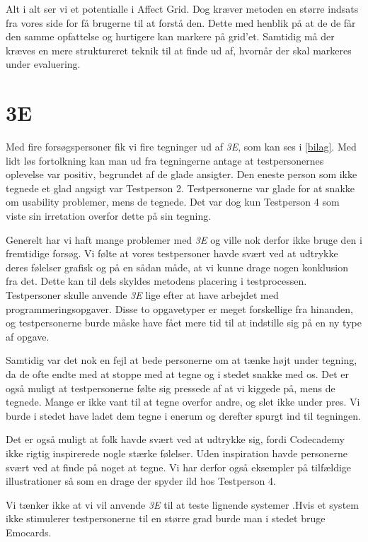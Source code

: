 Alt i alt ser vi et potentialle i Affect Grid. Dog kræver metoden en større indsats fra vores side for få brugerne til at forstå den. Dette med henblik på at de de får den samme opfattelse og hurtigere kan markere på grid'et. Samtidig må der kræves en mere struktureret teknik til at finde ud af, hvornår der skal markeres under evaluering.  


\section{3E}\label{sec:eval3E}
Med fire forsøgspersoner fik vi fire tegninger ud af \textit{3E}, som kan ses i \cref{bilag}. Med lidt løs fortolkning kan man ud fra tegningerne antage at testpersonernes oplevelse var positiv, begrundet af de glade ansigter. Den eneste person som ikke tegnede et glad angsigt var Testperson 2. Testpersonerne var glade for at snakke om usability problemer, mens de tegnede. Det var dog kun Testperson 4 som viste sin irretation overfor dette på sin tegning. 

Generelt har vi haft mange problemer med \textit{3E} og ville nok derfor ikke bruge den i fremtidige forsøg. Vi følte at vores testpersoner havde svært ved at udtrykke deres følelser grafisk og på en sådan måde, at vi kunne drage nogen konklusion fra det. Dette kan til dels skyldes metodens placering i testprocessen. Testpersoner skulle anvende \textit{3E} lige efter at have arbejdet med programmeringsopgaver. Disse to opgavetyper er meget forskellige fra hinanden, og testpersonerne burde måske have fået  mere tid til at indstille sig på en ny type af opgave.   

Samtidig var det nok en fejl at bede personerne om at tænke højt under tegning, da de ofte endte med at stoppe med at tegne og i stedet snakke med os. Det er også muligt at testpersonerne følte sig pressede af at vi kiggede på, mens de tegnede. Mange er ikke vant til at tegne overfor andre, og slet ikke under pres. Vi burde i stedet have ladet dem tegne i enerum og derefter spurgt ind til tegningen. 

Det er også muligt at folk havde svært ved at udtrykke sig, fordi Codecademy ikke rigtig inspirerede nogle stærke følelser. Uden inspiration havde personerne svært ved at finde på noget at tegne. Vi har derfor også eksempler på tilfældige illustrationer så som en drage der spyder ild hos Testperson 4. 

Vi tænker ikke at vi vil anvende \textit{3E} til at teste lignende systemer .Hvis et system ikke stimulerer testpersonerne til en større grad burde man i stedet bruge Emocards.